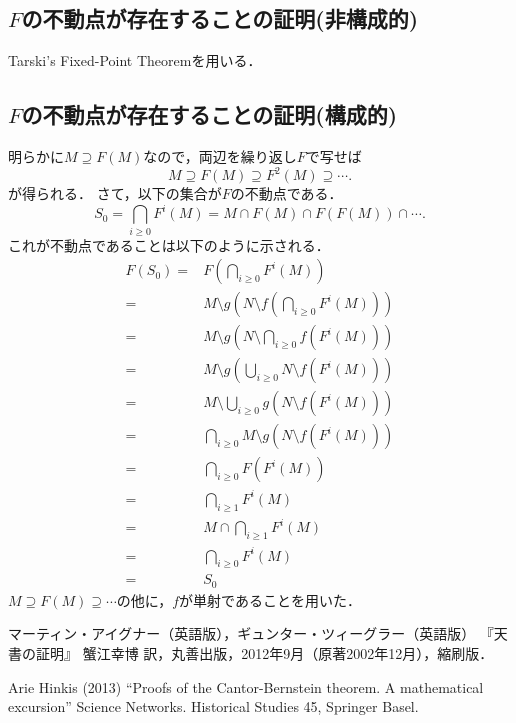 \documentclass[a4j, 10pt]{jarticle}
\begin{document}
    \subsection{$F$の不動点が存在することの証明(非構成的)}
    Tarski’s Fixed-Point Theoremを用いる．

    \subsection{$F$の不動点が存在することの証明(構成的)}
    明らかに$M \supseteq F(M)$なので，両辺を繰り返し$F$で写せば
    \[ M \supseteq F(M) \supseteq F^2(M) \supseteq \cdots. \]
    が得られる．
    さて，以下の集合が$F$の不動点である．
    \[ S_0=\bigcap_{i \geq 0}{F^{i}(M)}=M \cap F(M) \cap F(F(M)) \cap \cdots. \]
    これが不動点であることは以下のように示される．
    \begin{align*}
    F(S_0)
    =&F \left(\bigcap_{i \geq 0}{F^{i}(M)} \right) \\
    =&M \setminus g \left(N \setminus f \left(\bigcap_{i \geq 0}{F^{i}(M)} \right) \right) \\
    =&M \setminus g \left(N \setminus \bigcap_{i \geq 0}{f(F^{i}(M))} \right)\\
    =&M \setminus g \left(\bigcup_{i \geq 0}{N \setminus f(F^{i}(M))} \right)\\
    =&M \setminus \bigcup_{i \geq 0}{g(N \setminus f(F^{i}(M)))}\\
    =& \bigcap_{i \geq 0}{M \setminus g(N \setminus f(F^{i}(M)))}\\
    =& \bigcap_{i \geq 0}{F(F^{i}(M))} \\
    =& \bigcap_{i \geq 1}{F^{i}(M)} \\
    =& M \cap \bigcap_{i \geq 1}{F^{i}(M)} \\
    =& \bigcap_{i \geq 0}{F^{i}(M)} \\
    =& S_0
    \end{align*}
    $M \supseteq F(M) \supseteq \cdots$の他に，$f$が単射であることを用いた．

    \begin{thebibliography}{99}
            マーティン・アイグナー（英語版），ギュンター・ツィーグラー（英語版）
            『天書の証明』 蟹江幸博 訳，丸善出版，2012年9月（原著2002年12月），縮刷版．

        Arie Hinkis (2013) 
        ``Proofs of the Cantor-Bernstein theorem. A mathematical excursion''
        Science Networks. Historical Studies 45, Springer Basel.
    \end{thebibliography}
\end{document}
